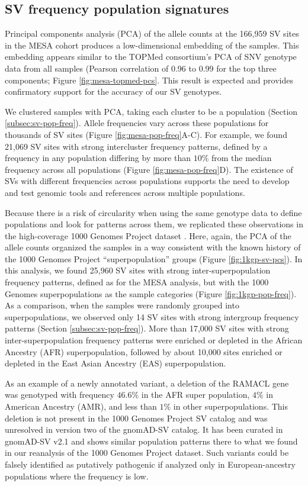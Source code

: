 \documentclass[11pt]{ucscthesis}
\begin{document}
\subsection{SV frequency population signatures}
\label{subsec:inter-super-pop}
Principal components analysis (PCA) of the allele counts at the 166,959 SV sites in the MESA cohort produces a low-dimensional embedding of the samples.
This embedding appears similar to the TOPMed consortium’s PCA of SNV genotype data from all samples (Pearson correlation of 0.96 to 0.99 for the top three components; Figure \ref{fig:mesa-topmed-pcs}.
This result is expected and provides confirmatory support for the accuracy of our SV genotypes.

We clustered samples with PCA, taking each cluster to be a population (Section \ref{subsec:sv-pop-freq}).
Allele frequencies vary across these populations for thousands of SV sites (Figure \ref{fig:mesa-pop-freq}A-C).
For example, we found 21,069 SV sites with strong intercluster frequency patterns, defined by a frequency in any population differing by more than $10\%$ from the median frequency across all populations (Figure \ref{fig:mesa-pop-freq}D).
The existence of SVs with different frequencies across populations supports the need to develop and test genomic tools and references across multiple populations.

Because there is a risk of circularity when using the same genotype data to define populations and look for patterns across them, we replicated these observations in the high-coverage 1000 Genomes Project dataset \cite{1000gp_nygc_2021}.
Here, again, the PCA of the allele counts organized the samples in a way consistent with the known history of the 1000 Genomes Project “superpopulation” groups (Figure \ref{fig:1kgp-sv-pcs}).
In this analysis, we found 25,960 SV sites with strong inter-superpopulation frequency patterns, defined as for the MESA analysis, but with the 1000 Genomes superpopulations as the sample categories (Figure \ref{fig:1kgp-pop-freq}).
As a comparison, when the samples were randomly grouped into superpopulations, we observed only 14 SV sites with strong intergroup frequency patterns (Section \ref{subsec:sv-pop-freq}).
More than 17,000 SV sites with strong inter-superpopulation frequency patterns were enriched or depleted in the African Ancestry (AFR) superpopulation, followed by about 10,000 sites enriched or depleted in the East Asian Ancestry (EAS) superpopulation.

As an example of a newly annotated variant, a deletion of the RAMACL gene was genotyped with frequency $46.6\%$ in the AFR super population, $4\%$ in American Ancestry (AMR), and less than $1\%$ in other superpopulations.
This deletion is not present in the 1000 Genomes Project SV catalog and was unresolved in version two of the gnomAD-SV catalog.
It has been curated in gnomAD-SV v2.1 and shows similar population patterns there to what we found in our reanalysis of the 1000 Genomes Project dataset.
Such variants could be falsely identified as putatively pathogenic if analyzed only in European-ancestry populations where the frequency is low.
\end{document}
